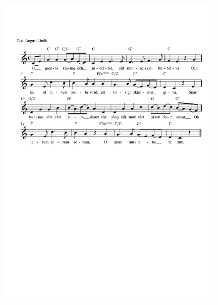 \documentclass[a6paper,11pt]{article}
\begin{document}
\setlength{\oddsidemargin}{-0.67in}
\begin{center}
\end{center}
\vspace{-40pt}
\begin{figure}[!h]
\centering
\includegraphics[width=\textwidth]{ogamlaklang}
\end{figure}
\end{document}
